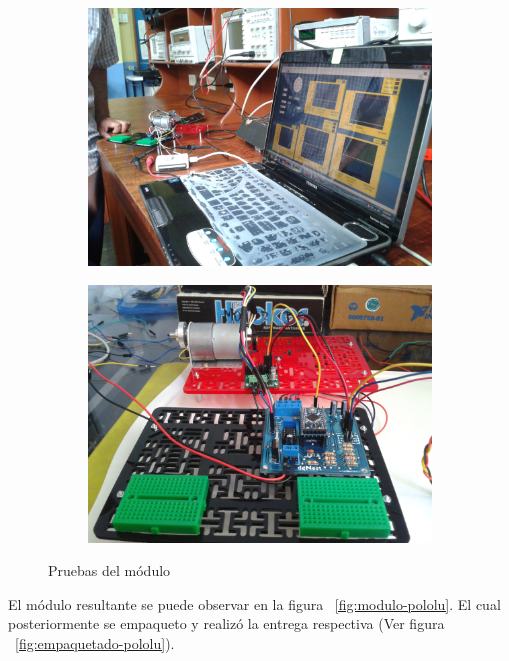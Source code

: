 \begin{figure}
  \centering
  \begin{subfigure}{0.45\textwidth}
    \centering
    \includegraphics[scale=0.065]{images/activities/motor_pololu/pruebas-control-velocidad.jpg}
  \end{subfigure}
  \begin{subfigure}{0.45\textwidth}
    \centering
    \includegraphics[scale=0.065]{images/activities/motor_pololu/pruebas-motor-pololu.jpg}
  \end{subfigure}
  \caption{Pruebas del módulo}
  \label{fig:pruebas-motor-pololu}
\end{figure}

El módulo resultante se puede observar en la figura ~\ref{fig:modulo-pololu}. El cual posteriormente se empaqueto y realizó la entrega respectiva (Ver figura ~\ref{fig:empaquetado-pololu}).

